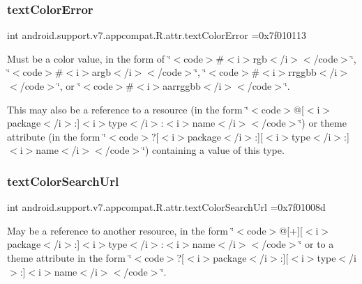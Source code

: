 \subsubsection{\texorpdfstring{text\+Color\+Error}{textColorError}}
{\footnotesize\ttfamily int android.\+support.\+v7.\+appcompat.\+R.\+attr.\+text\+Color\+Error =0x7f010113\hspace{0.3cm}{\ttfamily [static]}}

Must be a color value, in the form of \char`\"{}$<$code$>$\#$<$i$>$rgb$<$/i$>$$<$/code$>$\char`\"{}, \char`\"{}$<$code$>$\#$<$i$>$argb$<$/i$>$$<$/code$>$\char`\"{}, \char`\"{}$<$code$>$\#$<$i$>$rrggbb$<$/i$>$$<$/code$>$\char`\"{}, or \char`\"{}$<$code$>$\#$<$i$>$aarrggbb$<$/i$>$$<$/code$>$\char`\"{}. 

This may also be a reference to a resource (in the form \char`\"{}$<$code$>$@\mbox{[}$<$i$>$package$<$/i$>$\+:\mbox{]}$<$i$>$type$<$/i$>$\+:$<$i$>$name$<$/i$>$$<$/code$>$\char`\"{}) or theme attribute (in the form \char`\"{}$<$code$>$?\mbox{[}$<$i$>$package$<$/i$>$\+:\mbox{]}\mbox{[}$<$i$>$type$<$/i$>$\+:\mbox{]}$<$i$>$name$<$/i$>$$<$/code$>$\char`\"{}) containing a value of this type. \mbox{\label{classandroid_1_1support_1_1v7_1_1appcompat_1_1R_1_1attr_a05d18409c9b5b41fbde88ff790d081d2}} 
\subsubsection{\texorpdfstring{text\+Color\+Search\+Url}{textColorSearchUrl}}
{\footnotesize\ttfamily int android.\+support.\+v7.\+appcompat.\+R.\+attr.\+text\+Color\+Search\+Url =0x7f01008d\hspace{0.3cm}{\ttfamily [static]}}

May be a reference to another resource, in the form \char`\"{}$<$code$>$@\mbox{[}+\mbox{]}\mbox{[}$<$i$>$package$<$/i$>$\+:\mbox{]}$<$i$>$type$<$/i$>$\+:$<$i$>$name$<$/i$>$$<$/code$>$\char`\"{} or to a theme attribute in the form \char`\"{}$<$code$>$?\mbox{[}$<$i$>$package$<$/i$>$\+:\mbox{]}\mbox{[}$<$i$>$type$<$/i$>$\+:\mbox{]}$<$i$>$name$<$/i$>$$<$/code$>$\char`\"{}. 

